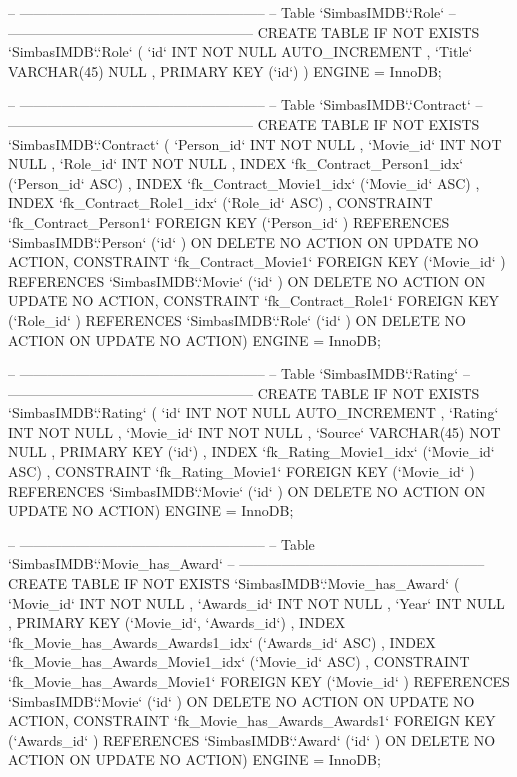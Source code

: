 \begin{spverbatim}
-- -----------------------------------------------------
-- Table `SimbasIMDB`.`Role`
-- -----------------------------------------------------
CREATE  TABLE IF NOT EXISTS `SimbasIMDB`.`Role` (
  `id` INT NOT NULL AUTO_INCREMENT ,
  `Title` VARCHAR(45) NULL ,
  PRIMARY KEY (`id`) )
ENGINE = InnoDB;


-- -----------------------------------------------------
-- Table `SimbasIMDB`.`Contract`
-- -----------------------------------------------------
CREATE  TABLE IF NOT EXISTS `SimbasIMDB`.`Contract` (
  `Person_id` INT NOT NULL ,
  `Movie_id` INT NOT NULL ,
  `Role_id` INT NOT NULL ,
  INDEX `fk_Contract_Person1_idx` (`Person_id` ASC) ,
  INDEX `fk_Contract_Movie1_idx` (`Movie_id` ASC) ,
  INDEX `fk_Contract_Role1_idx` (`Role_id` ASC) ,
  CONSTRAINT `fk_Contract_Person1`
    FOREIGN KEY (`Person_id` )
    REFERENCES `SimbasIMDB`.`Person` (`id` )
    ON DELETE NO ACTION
    ON UPDATE NO ACTION,
  CONSTRAINT `fk_Contract_Movie1`
    FOREIGN KEY (`Movie_id` )
    REFERENCES `SimbasIMDB`.`Movie` (`id` )
    ON DELETE NO ACTION
    ON UPDATE NO ACTION,
  CONSTRAINT `fk_Contract_Role1`
    FOREIGN KEY (`Role_id` )
    REFERENCES `SimbasIMDB`.`Role` (`id` )
    ON DELETE NO ACTION
    ON UPDATE NO ACTION)
ENGINE = InnoDB;


-- -----------------------------------------------------
-- Table `SimbasIMDB`.`Rating`
-- -----------------------------------------------------
CREATE  TABLE IF NOT EXISTS `SimbasIMDB`.`Rating` (
  `id` INT NOT NULL AUTO_INCREMENT ,
  `Rating` INT NOT NULL ,
  `Movie_id` INT NOT NULL ,
  `Source` VARCHAR(45) NOT NULL ,
  PRIMARY KEY (`id`) ,
  INDEX `fk_Rating_Movie1_idx` (`Movie_id` ASC) ,
  CONSTRAINT `fk_Rating_Movie1`
    FOREIGN KEY (`Movie_id` )
    REFERENCES `SimbasIMDB`.`Movie` (`id` )
    ON DELETE NO ACTION
    ON UPDATE NO ACTION)
ENGINE = InnoDB;


-- -----------------------------------------------------
-- Table `SimbasIMDB`.`Movie_has_Award`
-- -----------------------------------------------------
CREATE  TABLE IF NOT EXISTS `SimbasIMDB`.`Movie_has_Award` (
  `Movie_id` INT NOT NULL ,
  `Awards_id` INT NOT NULL ,
  `Year` INT NULL ,
  PRIMARY KEY (`Movie_id`, `Awards_id`) ,
  INDEX `fk_Movie_has_Awards_Awards1_idx` (`Awards_id` ASC) ,
  INDEX `fk_Movie_has_Awards_Movie1_idx` (`Movie_id` ASC) ,
  CONSTRAINT `fk_Movie_has_Awards_Movie1`
    FOREIGN KEY (`Movie_id` )
    REFERENCES `SimbasIMDB`.`Movie` (`id` )
    ON DELETE NO ACTION
    ON UPDATE NO ACTION,
  CONSTRAINT `fk_Movie_has_Awards_Awards1`
    FOREIGN KEY (`Awards_id` )
    REFERENCES `SimbasIMDB`.`Award` (`id` )
    ON DELETE NO ACTION
    ON UPDATE NO ACTION)
ENGINE = InnoDB;



\end{spverbatim}
